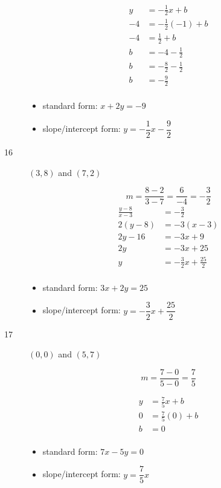 \documentclass[fleqn,addpoints]{exam}
\begin{document}
\begin{description}
\begin{align*}
  y &= - \frac{1}{2} x + b \\
  -4 &= - \frac{1}{2} (-1) + b \\
  -4 &= \frac{1}{2} + b \\
  b &= -4 - \frac{1}{2} \\
  b &= - \frac{8}{2} - \frac{1}{2} \\
  b &= - \frac{9}{2} \\
\end{align*}

\begin{itemize}
  \item standard form: $x+2y=-9$
  \item slope/intercept form: $y = - \dfrac{1}{2} x - \dfrac{9}{2}$
\end{itemize}


\item[16]

$(3, 8)$ and $(7, 2)$

\[
  m = \frac{8-2}{3-7} = \frac{6}{-4} = -\frac{3}{2}
\]
\begin{align*}
  \frac{y - 8}{x - 3} &= -\frac{3}{2} \\
  2(y-8) &= -3(x-3) \\
  2y-16 &= -3x+9 \\
  2y &= -3x+25 \\
  y &= - \frac{3}{2} x + \frac{25}{2} \\
\end{align*}

\begin{itemize}
  \item standard form: $3x+2y=25$
  \item slope/intercept form: $y = - \dfrac{3}{2} x + \dfrac{25}{2} $
\end{itemize}

\item[17]

$(0, 0)$ and $(5, 7)$

\[
  m = \frac{7-0}{5-0} = \frac{7}{5}
\]

\begin{align*}
  y &= \frac{7}{5} x + b \\
  0 &= \frac{7}{5} (0) + b \\
  b &= 0 \\
\end{align*}

\begin{itemize}
  \item standard form: $7x-5y=0$
  \item slope/intercept form: $y = \dfrac{7}{5} x$
\end{itemize}


\end{description}
\end{document}
